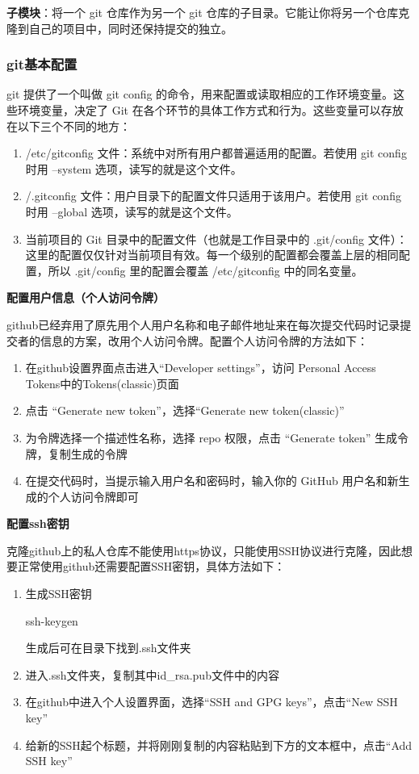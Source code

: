 \textbf{子模块}：将一个 git 仓库作为另一个 git 仓库的子目录。它能让你将另一个仓库克隆到自己的项目中，同时还保持提交的独立。

\subsubsection{git基本配置}

git 提供了一个叫做 git config 的命令，用来配置或读取相应的工作环境变量。这些环境变量，决定了 Git 在各个环节的具体工作方式和行为。这些变量可以存放在以下三个不同的地方：

\begin{enumerate}
\item /etc/gitconfig 文件：系统中对所有用户都普遍适用的配置。若使用 git config 时用 --system 选项，读写的就是这个文件。

\item \texttildelow /.gitconfig 文件：用户目录下的配置文件只适用于该用户。若使用 git config 时用 --global 选项，读写的就是这个文件。

\item 当前项目的 Git 目录中的配置文件（也就是工作目录中的 .git/config 文件）：这里的配置仅仅针对当前项目有效。每一个级别的配置都会覆盖上层的相同配置，所以 .git/config 里的配置会覆盖 /etc/gitconfig 中的同名变量。
\end{enumerate}

\textbf{配置用户信息（个人访问令牌）}

github已经弃用了原先用个人用户名称和电子邮件地址来在每次提交代码时记录提交者的信息的方案，改用个人访问令牌。配置个人访问令牌的方法如下：

\begin{enumerate}
\item 在github设置界面点击进入“Developer settings”，访问 Personal Access Tokens中的Tokens(classic)页面
\item 点击 “Generate new token”，选择“Generate new token(classic)”
\item 为令牌选择一个描述性名称，选择 repo 权限，点击 “Generate token” 生成令牌，复制生成的令牌
\item 在提交代码时，当提示输入用户名和密码时，输入你的 GitHub 用户名和新生成的个人访问令牌即可
\end{enumerate}

\textbf{配置ssh密钥}

克隆github上的私人仓库不能使用https协议，只能使用SSH协议进行克隆，因此想要正常使用github还需要配置SSH密钥，具体方法如下：

\begin{enumerate}
\item 生成SSH密钥

\begin{tcode}
	ssh-keygen
\end{tcode}

生成后可在\texttildelow 目录下找到.ssh文件夹
\item 进入.ssh文件夹，复制其中id\_rsa.pub文件中的内容
\item 在github中进入个人设置界面，选择“SSH and GPG keys”，点击“New SSH key”
\item 给新的SSH起个标题，并将刚刚复制的内容粘贴到下方的文本框中，点击“Add SSH key”
\end{enumerate}

